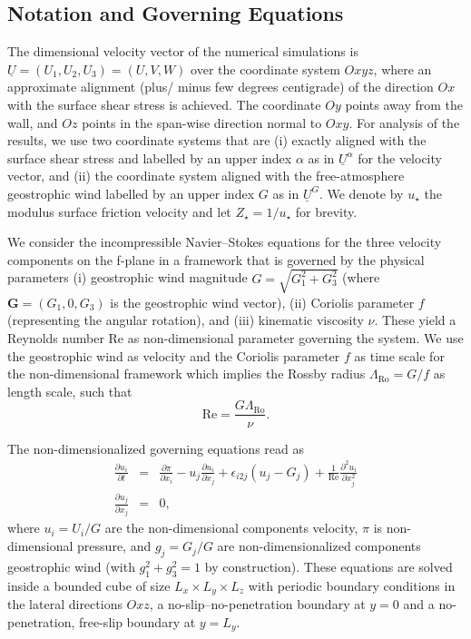\documentclass[a4paper,11pt]{amsart}
\newcommand{\p}{\partial}
\newcommand{\RO}{\mathrm{Ro}}
\newcommand{\RE}{\mathrm{Re}}
\newcommand{\LR}{\Lambda_\RO}
\begin{document}
\subsection{Notation and Governing Equations}
%
The dimensional velocity vector of the numerical simulations is $\underline{U} = (U_1,U_2,U_3) = (U,V,W)$ over the coordinate system
$Oxyz$, where an approximate alignment (plus/ minus few degrees centigrade) of the direction $Ox$ with the surface shear stress is achieved.
The coordinate $Oy$ points away from the wall,  and $Oz$ points in the span-wise direction normal to $Oxy$.
For analysis of the results, we use two coordinate systems that are
(i)  exactly aligned with the surface shear stress and labelled by an upper index $\alpha$ as in $\underline{U}^\alpha$ for the velocity vector, and
(ii) the coordinate system aligned with the free-atmosphere geostrophic wind labelled by an upper index $G$ as in $\underline{U}^G$.
%
We denote by $u_\star$ the modulus surface friction velocity and let $Z_\star=1/u_\star$ for brevity. 
%
\par
%
We consider the incompressible Navier--Stokes equations for the three velocity components on the f-plane in a framework
that is governed by the physical parameters
(i)   geostrophic wind magnitude $G=\sqrt{G_1^2+G_3^2}$ (where $\mathbf{G}=(G_1,0,G_3)$ is the geostrophic wind vector),
(ii)  Coriolis parameter $f$ (representing the angular rotation), and
(iii) kinematic viscosity $\nu$.
These yield a Reynolds number $\RE$ as non-dimensional parameter governing the system.
%
We use the geostrophic wind as velocity and the Coriolis parameter $f$ as time scale for the non-dimensional framework which implies the Rossby radius $\LR=G/f$ as length scale, such that
\begin{equation}
  \RE=\frac{G \LR }{\nu}. 
\end{equation}
%
\par
%
The non-dimensionalized governing equations read as 
\begin{subequations} 
\begin{eqnarray}
  \frac{\partial u_i}{\partial t} &=& \frac{\p \pi}{\p x_i} - u_j \frac{\p u_i}{\p x_j} + \epsilon_{i2j} (u_j -G_j)   + \frac{1}{\RE} \frac{\p^2 u_i}{\p x_{j}^2} \\ 
  \frac{\partial u_j}{\partial x_j} &=& 0,   
\end{eqnarray} 
\label{eqn:governing} 
\end{subequations}
where $u_i=U_i/G$ are the non-dimensional components velocity, $\pi$ is non-dimensional pressure, and $g_j=G_j/G$ are non-dimensionalized components
geostrophic wind (with $g_{1}^2+g_{3}^2=1$ by construction).
%
These equations are solved inside a bounded cube of size $L_x \times L_y \times L_z$ with periodic boundary conditions in the lateral directions $Oxz$, a no-slip--no-penetration boundary at $y=0$ and
a no-penetration, free-slip boundary at $y=L_y$.
%
\end{document}
